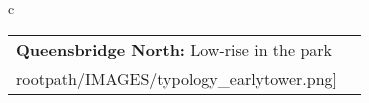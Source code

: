\begin{table}[H]
        \begin{tabular}{c}
        \begin{tabular}{m{1.5in} m{2in}}
\textbf{Queensbridge North:} {Low-rise in the park} & \texttt{[image: \\rootpath/IMAGES/typology\_earlytower.png]}
\end{tabular}\end{tabular}
        \end{table}